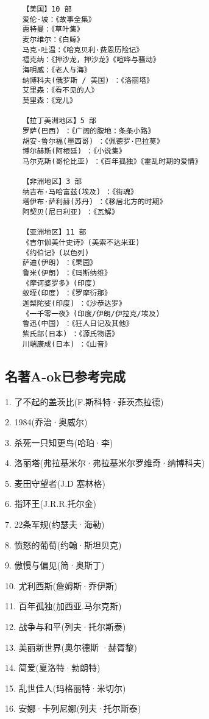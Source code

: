 \documentclass[UTF8]{../RepresentationUniverse}
\begin{document}
\begin{lstlisting}
    【美国】10 部 
    爱伦·坡：《故事全集》
    惠特曼：《草叶集》
    麦尔维尔：《白鲸》
    马克·吐温：《哈克贝利·费恩历险记》
    福克纳：《押沙龙，押沙龙》《喧哗与骚动》
    海明威：《老人与海》
    纳博科夫(俄罗斯 / 美国) ：《洛丽塔》
    艾里森：《看不见的人》
    莫里森：《宠儿》
    
    【拉丁美洲地区】5 部 
    罗萨(巴西) ：《广阔的腹地：条条小路》
    胡安·鲁尔福(墨西哥) ：《佩德罗·巴拉莫》
    博尔赫斯(阿根廷) ：《小说集》
    马尔克斯(哥伦比亚) ：《百年孤独》《霍乱时期的爱情》
    
    【非洲地区】3 部 
    纳吉布·马哈富兹(埃及) ：《街魂》
    塔伊布·萨利赫(苏丹) ：《移居北方的时期》
    阿契贝(尼日利亚) ：《瓦解》
    
    【亚洲地区】11 部 
    《吉尔伽美什史诗》(美索不达米亚) 
    《约伯记》(以色列) 
    萨迪(伊朗) ：《果园》
    鲁米(伊朗) ：《玛斯纳维》
    《摩诃婆罗多》(印度) 
    蚁垤(印度) ：《罗摩衍那》
    迦梨陀娑(印度) ：《沙恭达罗》
    《一千零一夜》(印度/伊朗/伊拉克/埃及) 
    鲁迅(中国) ：《狂人日记及其他》
    紫氏部(日本) ：《源氏物语》
    川端康成(日本) ：《山音》
\end{lstlisting}



\subsection{名著A-ok已参考完成}

1. 了不起的盖茨比(F.斯科特·菲茨杰拉德) 

2. 1984(乔治·奥威尔) 

3. 杀死一只知更鸟(哈珀·李) 

4. 洛丽塔(弗拉基米尔·弗拉基米尔罗维奇·纳博科夫) 

5. 麦田守望者(J.D 塞林格) 

6. 指环王(J.R.R.托尔金) 

7. 22条军规(约瑟夫·海勒) 

8. 愤怒的葡萄(约翰·斯坦贝克) 

9. 傲慢与偏见(简·奥斯丁) 

10. 尤利西斯(詹姆斯·乔伊斯) 

11. 百年孤独(加西亚.马尔克斯) 

12. 战争与和平(列夫·托尔斯泰) 

13. 美丽新世界(奥尔德斯 ·赫胥黎) 

14. 简爱(夏洛特·勃朗特) 

15. 乱世佳人(玛格丽特·米切尔) 

16. 安娜·卡列尼娜(列夫·托尔斯泰) 
\end{document}
